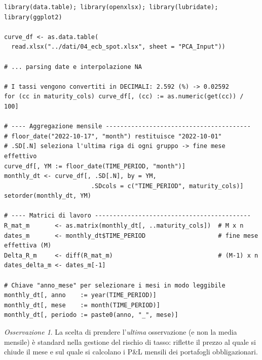 \documentclass[11pt,a4paper]{article}
\theoremstyle{plain}
\theoremstyle{definition}
\theoremstyle{remark}
\newtheorem*{osservazione}{Osservazione}
\begin{document}
\begin{codebox}
\begin{Verbatim}[fontsize=\small]
library(data.table); library(openxlsx); library(lubridate); library(ggplot2)

curve_df <- as.data.table(
  read.xlsx("../dati/04_ecb_spot.xlsx", sheet = "PCA_Input"))

# ... parsing date e interpolazione NA

# I tassi vengono convertiti in DECIMALI: 2.592 (%) -> 0.02592
for (cc in maturity_cols) curve_df[, (cc) := as.numeric(get(cc)) / 100]

# ---- Aggregazione mensile ----------------------------------------
# floor_date("2022-10-17", "month") restituisce "2022-10-01"
# .SD[.N] seleziona l'ultima riga di ogni gruppo -> fine mese effettivo
curve_df[, YM := floor_date(TIME_PERIOD, "month")]
monthly_dt <- curve_df[, .SD[.N], by = YM,
                        .SDcols = c("TIME_PERIOD", maturity_cols)]
setorder(monthly_dt, YM)

# ---- Matrici di lavoro -------------------------------------------
R_mat_m       <- as.matrix(monthly_dt[, ..maturity_cols])  # M x n
dates_m       <- monthly_dt$TIME_PERIOD                    # fine mese effettiva (M)
Delta_R_m     <- diff(R_mat_m)                             # (M-1) x n
dates_delta_m <- dates_m[-1]

# Chiave "anno_mese" per selezionare i mesi in modo leggibile
monthly_dt[, anno    := year(TIME_PERIOD)]
monthly_dt[, mese    := month(TIME_PERIOD)]
monthly_dt[, periodo := paste0(anno, "_", mese)]
\end{Verbatim}
\end{codebox}

\begin{osservazione}
La scelta di prendere l'\emph{ultima} osservazione (e non la media mensile) è
standard nella gestione del rischio di tasso: riflette il prezzo al quale si
chiude il mese e sul quale si calcolano i P\&L mensili dei portafogli obbligazionari.
\end{osservazione}

%
\end{document}

